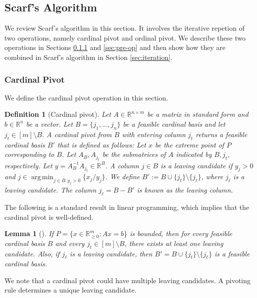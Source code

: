 \documentclass[11pt]{article}
\DeclareMathOperator*{\argmin}{arg\,min}
\newcommand{\R}{\mathbb{R}}
\newtheorem{lemma}[theorem]{Lemma}
\newtheorem{definition}[theorem]{Definition}
\begin{document}
\subsection{Scarf's Algorithm}\label{sec:pre-Scarf-alg}

We review Scarf's algorithm in this section. It involves the iterative repetion of two operations, namely cardinal pivot and ordinal pivot. We describe these two operations in Sections \ref{sec:pre-cp} and \ref{sec:pre-op} and then show how they are combined in Scarf's algorithm in Section \ref{sec:iteration}. 



\subsubsection{Cardinal Pivot}\label{sec:pre-cp}
We define the cardinal pivot operation in this section. 





\begin{definition}[Cardinal pivot]\label{def:cpdef}
Let $A\in \R^{n\times m}$ be a matrix in standard form and $b\in \R^n$ be a vector. 
Let $B=\{j_1,\dots,j_n\}$ be a feasible cardinal basis and let $j_t\in[m]\setminus B$. A \emph{cardinal pivot} from $B$ with \emph{entering column} $j_t$ returns a feasible cardinal basis $B'$ that is defined as follows:
Let $x$ be the extreme point of $P$ corresponding to $B$. Let $A_B,A_{j_t}$ be the submatrices of $A$ indicated by $B,j_t$, respectively. Let $y=A_B^{-1}A_{j_t}\in\mathbb{R}^B$. A column $j\in B$ is a \emph{leaving candidate} if $y_j>0$ and $j\in\argmin_{j\in B:y_j>0}\{x_j/y_j\}$. We define $B':=B\cup\{j_t\}\setminus\{j_\ell\}$, where $j_\ell$ is a leaving candidate. The column $j_\ell=B-B'$ is known as the leaving column.
\end{definition}
The following is a standard result in linear programming, which implies that the cardinal pivot is well-defined. \begin{lemma}[\cite{scarf1967core}]\label{lem:scarf-cp}
If $P=\{x\in\mathbb{R}^m_{\ge 0}:Ax=b\}$ is bounded, then for every feasible cardinal basis $B$ and every $j_t\in [m]\setminus B$, there exists at least one leaving candidate. Also, if $j_\ell$ is a leaving candidate, then $B'=B\cup\{j_t\}\setminus\{j_\ell\}$ is a feasible cardinal basis.
\end{lemma}




We note that a cardinal pivot could have multiple leaving candidates. A pivoting rule determines a unique leaving candidate. 
\end{document}
